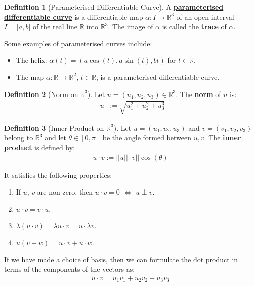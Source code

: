 \documentclass[11pt]{scrartcl}
\newcommand{\R}[0]{\mathbb{R}}
\theoremstyle{definition}
\newtheorem{definition}{Definition}
\theoremstyle{remark}
\newcommand{\dfn}[1]{\textbf{\underline{#1}}}
\begin{document}
{\begin{definition}[Parameterised Differentiable Curve] 
	A \dfn{parameterised differentiable curve} is a differentiable map $ \alpha: I \rightarrow \R^3$ of an open interval $I = ]a,b[$ of the real line $\R$ into $\R^3$. The image of $\alpha$ is called the \dfn{trace} of $\alpha$. 
\end{definition}

Some examples of parameterised curves include: 
\begin{itemize}[noitemsep]
	\item The helix: $\alpha(t) = (a \cos (t), a \sin(t), bt)$ for $t \in \R$. 
	\item The map $\alpha: \R \rightarrow \R^2$, $t \in \R$, is a parameterised differentiable curve. 
\end{itemize}

\begin{definition}[Norm on $\R^3$]
	Let $u = (u_1, u_2, u_3) \in \R^3$. The \dfn{norm} of $u$ is: 
	\begin{align*}
		|| u || := \sqrt{ u_1^2 + u_2^2 + u_3^3} 
	\end{align*}
\end{definition}

\begin{definition}[Inner Product on $\R^3$] 
	Let $u = (u_1, u_2, u_3)$ and $v= (v_1, v_2, v_3)$ belong to $\R^3$ and let $\theta \in [0, \pi]$ be the angle formed between $u,v$. The \dfn{inner product} is defined by: 
	\begin{align}
		u \cdot v := || u || ||v|| \cos (\theta) 	
	\end{align}
\end{definition}
It satisfies the following properties: 
\begin{enumerate}[noitemsep]
	\item If $u$, $v$ are non-zero, then $u \cdot v = 0$ $\iff$ $u \perp v$. 
	\item $u \cdot v = v \cdot u$. 
	\item $\lambda (u \cdot v ) = \lambda u \cdot v =  u \cdot \lambda v$. 
	\item $u ( v + w) = u \cdot v + u \cdot w$. 
\end{enumerate}
If we have made a choice of basis, then we can formulate the dot product in terms of the components of the vectors as: 
\begin{align}
	u \cdot v = u_1 v_1 + u_2 v_2 + u_3 v_3 	
\end{align}

}
\end{document}
